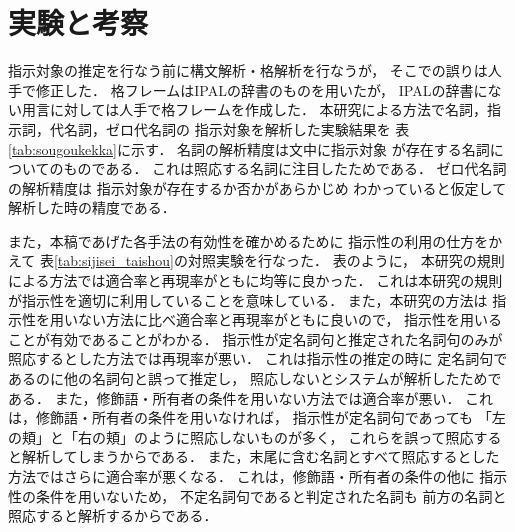 \section{実験と考察}

指示対象の推定を行なう前に構文解析・格解析を行なうが，
そこでの誤りは人手で修正した．
格フレームはIPALの辞書のものを用いたが，
IPALの辞書にない用言に対しては人手で格フレームを作成した．
本研究による方法で名詞，指示詞，代名詞，ゼロ代名詞の
指示対象を解析した実験結果を
表\ref{tab:sougoukekka}に示す．
名詞の解析精度は文中に指示対象
が存在する名詞についてのものである．
これは照応する名詞に注目したためである．
ゼロ代名詞の解析精度は
指示対象が存在するか否かがあらかじめ
わかっていると仮定して解析した時の精度である．



また，本稿であげた各手法の有効性を確かめるために
指示性の利用の仕方をかえて
表\ref{tab:sijisei_taishou}の対照実験を行なった．
表のように，
本研究の規則による方法では適合率と再現率がともに均等に良かった．
これは本研究の規則が指示性を適切に利用していることを意味している．
また，本研究の方法は
指示性を用いない方法に比べ適合率と再現率がともに良いので，
指示性を用いることが有効であることがわかる．
指示性が定名詞句と推定された名詞句のみが
照応するとした方法では再現率が悪い．
これは指示性の推定の時に
定名詞句であるのに他の名詞句と誤って推定し，
照応しないとシステムが解析したためである．
また，修飾語・所有者の条件を用いない方法では適合率が悪い．
これは，修飾語・所有者の条件を用いなければ，
指示性が定名詞句であっても
「左の頬」と「右の頬」のように照応しないものが多く，
これらを誤って照応すると解析してしまうからである．
また，末尾に含む名詞とすべて照応するとした方法ではさらに適合率が悪くなる．
これは，修飾語・所有者の条件の他に
指示性の条件を用いないため，
不定名詞句であると判定された名詞も
前方の名詞と照応すると解析するからである．

